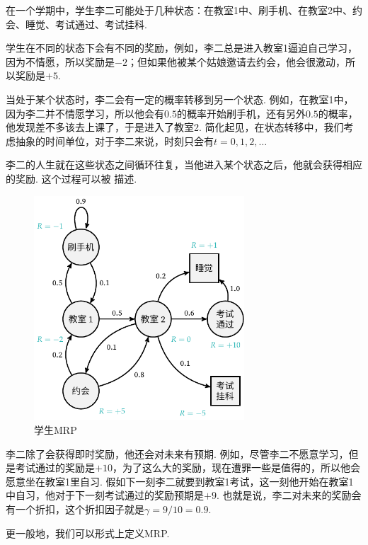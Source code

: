 \begin{example}[李二的MRP]\label{ex:lier-MRP}
在一个学期中，学生李二可能处于几种状态：在教室1中、刷手机、在教室2中、约会、睡觉、考试通过、考试挂科. 

学生在不同的状态下会有不同的奖励，例如，李二总是进入教室1逼迫自己学习，因为不情愿，所以奖励是$-2$；但如果他被某个姑娘邀请去约会，他会很激动，所以奖励是$+5$. 

当处于某个状态时，李二会有一定的概率转移到另一个状态. 例如，在教室1中，因为李二并不情愿学习，所以他会有$0.5$的概率开始刷手机，还有另外$0.5$的概率，他发现差不多该去上课了，于是进入了教室2. 简化起见，在状态转移中，我们考虑抽象的时间单位，对于李二来说，时刻只会有$t=0,1,2,\dots$

李二的人生就在这些状态之间循环往复，当他进入某个状态之后，他就会获得相应的奖励. 这个过程可以被 描述.
\begin{figure}[ht]
    \centering
    \includegraphics[width=0.7\textwidth]{figures/Markov-chain/STR.pdf}
    \caption{学生MRP}
    \label{fig:student-MRP}
\end{figure}

李二除了会获得即时奖励，他还会对未来有预期. 例如，尽管李二不愿意学习，但是考试通过的奖励是$+10$，为了这么大的奖励，现在遭罪一些是值得的，所以他会愿意坐在教室1里自习. 假如下一刻李二就要到教室1考试，这一刻他开始在教室1中自习，他对于下一刻考试通过的奖励预期是$+9$. 也就是说，李二对未来的奖励会有一个折扣，这个折扣因子就是$\gamma=9/10=0.9$.
\end{example}

更一般地，我们可以形式上定义MRP.

